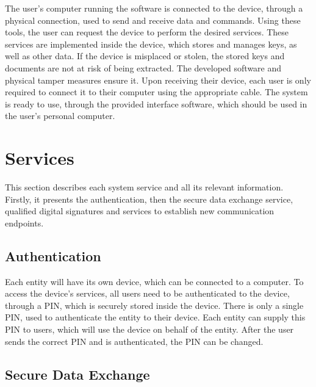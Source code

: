 The user's computer running the software is connected to the device, through a physical connection, used to send and receive data and commands.
Using these tools, the user can request the device to perform the desired services.
These services are implemented inside the device, which stores and manages keys, as well as other data.
If the device is misplaced or stolen, the stored keys and documents are not at risk of being extracted. The developed software and physical tamper measures ensure it.
Upon receiving their device, each user is only required to connect it to their computer using the appropriate cable. The system is ready to use, through the provided interface software, which should be used in the user's personal computer.

\section{Services}\label{chap:arch:services}

This section describes each system service and all its relevant information. 
Firstly, it presents the authentication, then the secure data exchange service, qualified digital signatures and services to establish new communication endpoints.

\subsection{Authentication}\label{chap:arch:services:auth}

Each entity will have its own device, which can be connected to a computer. To access the device's services, all users need to be authenticated to the device, through a PIN, which is securely stored inside the device. There is only a single PIN, used to authenticate the entity to their device.
Each entity can supply this PIN to users, which will use the device on behalf of the entity.
After the user sends the correct PIN and is authenticated, the PIN can be changed.

\subsection{Secure Data Exchange}\label{chap:arch:services:data-exchange}

